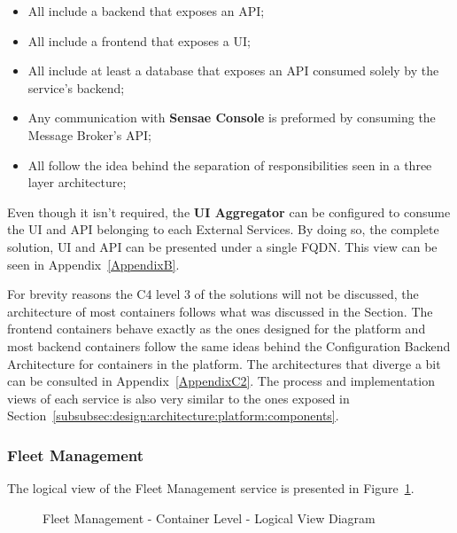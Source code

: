 \begin{itemize}
   \item All include a backend that exposes an \gls{API};
   \item All include a frontend that exposes a \gls{UI};
   \item All include at least a database that exposes an \gls{API} consumed solely by the service's backend;
   \item Any communication with \textbf{Sensae Console} is preformed by consuming the Message Broker's \gls{API};
   \item All follow the idea behind the separation of responsibilities seen in a three layer architecture;
\end{itemize}

Even though it isn't required, the \textbf{UI Aggregator} can be configured to consume the \gls{UI} and \gls{API} belonging to each External Services. By doing so, the complete solution, \gls{UI} and \gls{API} can be presented under a single \gls{FQDN}. This view can be seen in Appendix~\ref{AppendixB}.

For brevity reasons the C4 level 3 of the solutions will not be discussed, the architecture of most containers follows what was discussed in the  Section. The frontend containers behave exactly as the ones designed for the platform and most backend containers follow the same ideas behind the Configuration Backend Architecture for containers in the platform. The architectures that diverge a bit can be consulted in Appendix~\ref{AppendixC2}. The process and implementation views of each service is also very similar to the ones exposed in Section~\ref{subsubsec:design:architecture:platform:components}.

\subsubsection{Fleet Management}
\label{subsubsec:design:architecture:solutions:fleet}

The logical view of the Fleet Management service is presented in Figure~\ref{fig:design:architecture:solutions:containers:logical:fleet}.

\begin{figure}[H]
   \centering
   \resizebox{0.75\columnwidth}{!}
       {
       
       }
   \caption[Fleet Management - Container Level - Logical View Diagram]{Fleet Management - Container Level - Logical View Diagram}
   \label{fig:design:architecture:solutions:containers:logical:fleet}
\end{figure}

